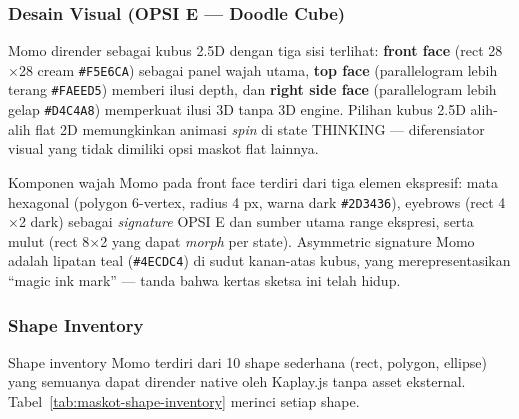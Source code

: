 \documentclass[12pt,a4paper,oneside,openany]{report}
\begin{document}
\subsubsection{Desain Visual (OPSI E --- Doodle Cube)}

Momo dirender sebagai kubus 2.5D dengan tiga sisi terlihat: \textbf{front face} (rect 28$\times$28 cream \texttt{\#F5E6CA}) sebagai panel wajah utama, \textbf{top face} (parallelogram lebih terang \texttt{\#FAEED5}) memberi ilusi depth, dan \textbf{right side face} (parallelogram lebih gelap \texttt{\#D4C4A8}) memperkuat ilusi 3D tanpa 3D engine. Pilihan kubus 2.5D alih-alih flat 2D memungkinkan animasi \textit{spin} di state THINKING --- diferensiator visual yang tidak dimiliki opsi maskot flat lainnya.

Komponen wajah Momo pada front face terdiri dari tiga elemen ekspresif: mata hexagonal (polygon 6-vertex, radius 4 px, warna dark \texttt{\#2D3436}), eyebrows (rect 4$\times$2 dark) sebagai \textit{signature} OPSI E dan sumber utama range ekspresi, serta mulut (rect 8$\times$2 yang dapat \textit{morph} per state). Asymmetric signature Momo adalah lipatan teal (\texttt{\#4ECDC4}) di sudut kanan-atas kubus, yang merepresentasikan ``magic ink mark'' --- tanda bahwa kertas sketsa ini telah hidup.

\subsubsection{Shape Inventory}

Shape inventory Momo terdiri dari 10 shape sederhana (rect, polygon, ellipse) yang semuanya dapat dirender native oleh Kaplay.js tanpa asset eksternal. Tabel~\ref{tab:maskot-shape-inventory} merinci setiap shape.
\end{document}
